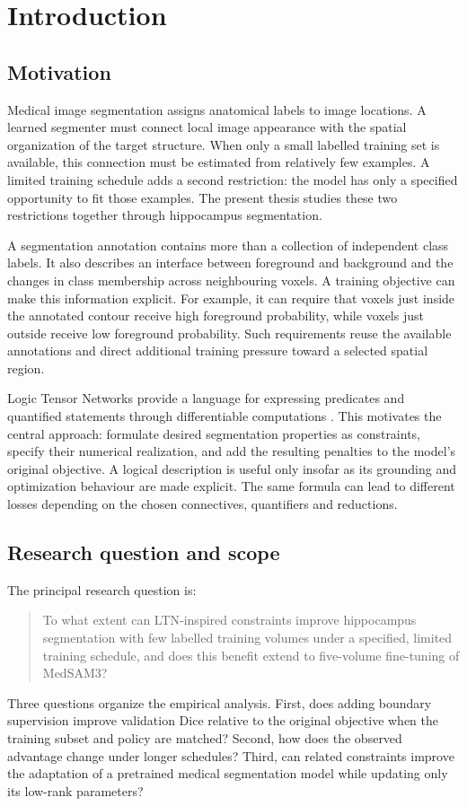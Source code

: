 \section{Introduction}\label{sec:introduction}
\subsection{Motivation}
Medical image segmentation assigns anatomical labels to image locations. A learned segmenter must connect local image appearance with the spatial organization of the target structure. When only a small labelled training set is available, this connection must be estimated from relatively few examples. A limited training schedule adds a second restriction: the model has only a specified opportunity to fit those examples. The present thesis studies these two restrictions together through hippocampus segmentation.

A segmentation annotation contains more than a collection of independent class labels. It also describes an interface between foreground and background and the changes in class membership across neighbouring voxels. A training objective can make this information explicit. For example, it can require that voxels just inside the annotated contour receive high foreground probability, while voxels just outside receive low foreground probability. Such requirements reuse the available annotations and direct additional training pressure toward a selected spatial region.

Logic Tensor Networks provide a language for expressing predicates and quantified statements through differentiable computations \cite{badreddine2022logic}. This motivates the central approach: formulate desired segmentation properties as constraints, specify their numerical realization, and add the resulting penalties to the model's original objective. A logical description is useful only insofar as its grounding and optimization behaviour are made explicit. The same formula can lead to different losses depending on the chosen connectives, quantifiers and reductions.

\subsection{Research question and scope}
The principal research question is:
\begin{quote}
To what extent can LTN-inspired constraints improve hippocampus segmentation with few labelled training volumes under a specified, limited training schedule, and does this benefit extend to five-volume fine-tuning of MedSAM3?
\end{quote}
Three questions organize the empirical analysis. First, does adding boundary supervision improve validation Dice relative to the original objective when the training subset and policy are matched? Second, how does the observed advantage change under longer schedules? Third, can related constraints improve the adaptation of a pretrained medical segmentation model while updating only its low-rank parameters?

